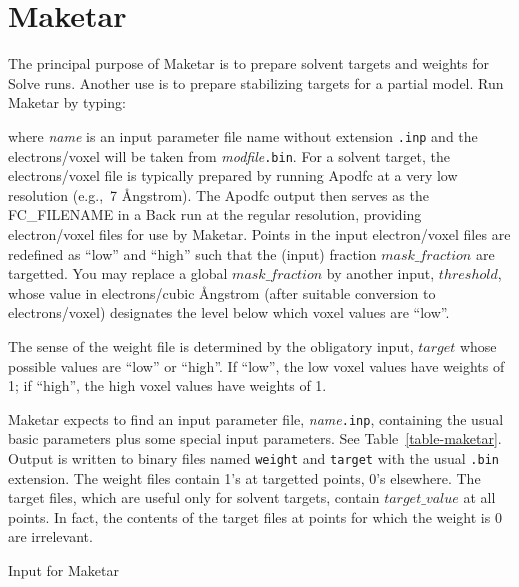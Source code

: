 \documentclass{report}
\begin{document}
{
\section {Maketar}
\label{preprocessors-maketar}

The principal purpose of Maketar is to prepare solvent targets and weights 
for Solve runs.  Another use is to prepare stabilizing targets for a partial 
model.  Run Maketar by typing:


where {\it name} is an input parameter file name without extension {\tt .inp} 
and the electrons/voxel will be taken from {\it modfile}{\tt .bin}.  
For a solvent target, 
the electrons/voxel file is typically prepared by running Apodfc 
at a very low resolution (e.g.,~7 \AA ngstrom).
The Apodfc output then serves as the 
FC\_FILENAME in a Back run at the regular
resolution, providing electron/voxel files for use by Maketar.
Points in the input electron/voxel files are redefined as ``low'' and ``high''
such that the (input) fraction $mask\_fraction$ are targetted.
You may replace a global $mask\_fraction$ by another input, $threshold$, whose
value in electrons/cubic \AA ngstrom (after suitable conversion
to electrons/voxel) designates the level below which voxel values are ``low''.

\vspace {0.1in}

The sense of the weight file is determined by the obligatory input, $target$
whose possible values are ``low'' or ``high''.  If ``low'', the low voxel
values have weights of 1; if ``high'', the high voxel values have weights
of 1.

\vspace {0.1in}

Maketar expects to find an input parameter file, {\it name}{\tt .inp}, 
containing the usual basic parameters plus some special input parameters.
See Table~\ref{table-maketar}.
Output is written to binary files named {\tt weight} and 
{\tt target} with the usual {\tt .bin} extension. 
The weight files contain 1's at targetted points, 0's elsewhere.
The target files, which are useful only for solvent targets,
 contain $target\_value$ at all points.
In fact, the contents of the target files at points for which the
weight is 0 are irrelevant.

\begin{table}[hbt]
\caption {\large Input for Maketar}
\label{table-maketar}


\end{table}}
\end{document}
